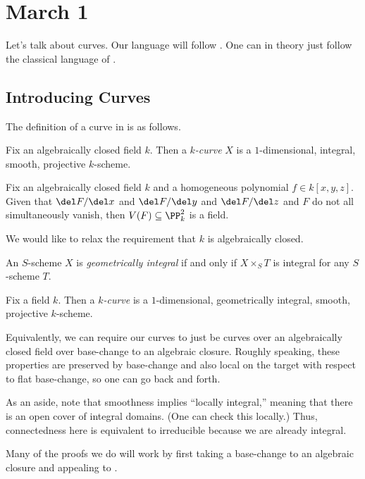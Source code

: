 \documentclass[../notes.tex]{subfiles}
\begin{document}
\section{March 1}

Let's talk about curves. Our language will follow \cite[Chapter~II, IV]{hartshorne}. One can in theory just follow the classical language of \cite{silverman}.

\subsection{Introducing Curves}
The definition of a curve in \cite{hartshorne} is as follows.
\begin{definition}[curve]
	Fix an algebraically closed field $k$. Then a \textit{$k$-curve} $X$ is a $1$-dimensional, integral, smooth, projective $k$-scheme.
\end{definition}
\begin{example}
	Fix an algebraically closed field $k$ and a homogeneous polynomial $f\in k[x,y,z]$. Given that $\del F/\del x$ and $\del F/\del y$ and $\del F/\del z$ and $F$ do not all simultaneously vanish, then $V(F)\subseteq\PP^2_k$ is a field.
\end{example}
We would like to relax the requirement that $k$ is algebraically closed.
\begin{definition}
	An $S$-scheme $X$ is \textit{geometrically integral} if and only if $X\times_ST$ is integral for any $S$-scheme $T$.
\end{definition}
\begin{definition}[curve]
	Fix a field $k$. Then a \textit{$k$-curve} is a $1$-dimensional, geometrically integral, smooth, projective $k$-scheme.
\end{definition}
\begin{remark}
	Equivalently, we can require our curves to just be curves over an algebraically closed field over base-change to an algebraic closure. Roughly speaking, these properties are preserved by base-change and also local on the target with respect to flat base-change, so one can go back and forth.
\end{remark}
\begin{remark}
	As an aside, note that smoothness implies ``locally integral,'' meaning that there is an open cover of integral domains. (One can check this locally.) Thus, connectedness here is equivalent to irreducible because we are already integral.
\end{remark}
Many of the proofs we do will work by first taking a base-change to an algebraic closure and appealing to \cite{hartshorne}.
\end{document}
